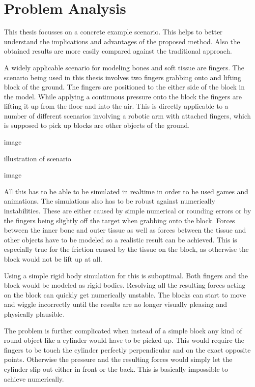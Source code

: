 \chapter{Problem Analysis}
\label{cha:problem_analysis}

This thesis focusses on a concrete example scenario. This helps to better understand the implications and advantages of the proposed method. Also the obtained results are more easily compared against the traditional approach.

A widely applicable scenario for modeling bones and soft tissue are fingers. The scenario being used in this thesis involves two fingers grabbing onto and lifting block of the ground. The fingers are positioned to the either side of the block in the model. While applying a continuous pressure onto the block the fingers are lifting it up from the floor and into the air. This is directly applicable to a number of different scenarios involving a robotic arm with attached fingers, which is supposed to pick up blocks are other objects of the ground.

image

illustration of scenario

image


All this has to be able to be simulated in realtime in order to be used games and animations. The simulations also has to be robust against numerically instabilities. These are either caused by simple numerical or rounding errors or by the fingers being slightly off the target when grabbing onto the block. Forces between the inner bone and outer tissue as well as forces between the tissue and other objects have to be modeled so a realistic result can be achieved. This is especially true for the friction caused by the tissue on the block, as otherwise the block would not be lift up at all.

Using a simple rigid body simulation for this is suboptimal. Both fingers and the block would be modeled as rigid bodies. Resolving all the resulting forces acting on the block can quickly get numerically unstable. The blocks can start to move and wiggle incorrectly until the results are no longer visually pleasing and physically plausible.

The problem is further complicated when instead of a simple block any kind of round object like a cylinder would have to be picked up. This would require the fingers to be touch the cylinder perfectly perpendicular and on the exact opposite points. Otherwise the pressure and the resulting forces would simply let the cylinder slip out either in front or the back. This is basically impossible to achieve numerically.

